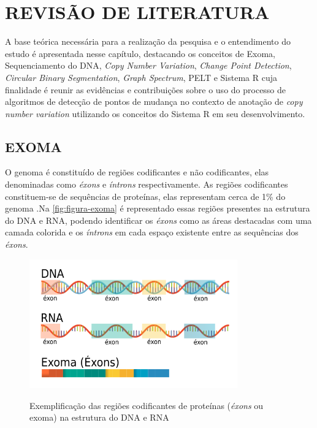 
\chapter{REVISÃO DE LITERATURA}
\label{chap:fundamentacaoTeorica}

A base teórica necessária para a realização da pesquisa e o entendimento do estudo é apresentada nesse capítulo, destacando os conceitos de Exoma, Sequenciamento do DNA, \textit{Copy Number Variation}, \textit{Change Point Detection}, \textit{Circular Binary Segmentation}, \textit{Graph Spectrum}, PELT e Sistema R cuja finalidade é reunir as evidências e contribuições sobre o uso do processo de algoritmos de detecção de pontos de mudança no contexto de anotação de \textit{copy number variation} utilizando os conceitos do Sistema R em seu desenvolvimento.

\section{EXOMA}

O genoma é constituído de regiões codificantes e não codificantes, elas denominadas como \textit{éxons} e \textit{íntrons} respectivamente. As regiões codificantes constituem-se de sequências de proteínas, elas representam cerca de 1\% do genoma \cite{Ng2009}.Na \autoref{fig:figura-exoma} é representado essas regiões presentes na estrutura do DNA e RNA, podendo identificar os \textit{éxons} como as áreas destacadas com uma camada colorida e os \textit{íntrons} em cada espaço existente entre as sequências dos \textit{éxons}.

\begin{figure}[!htb]
    \centering
    \caption{Exemplificação das regiões codificantes de proteínas (\textit{éxons} ou exoma) na estrutura do DNA e RNA}
    \includegraphics[width=0.8\textwidth]{./dados/figuras/exoma}
    \label{fig:figura-exoma}
\end{figure}

